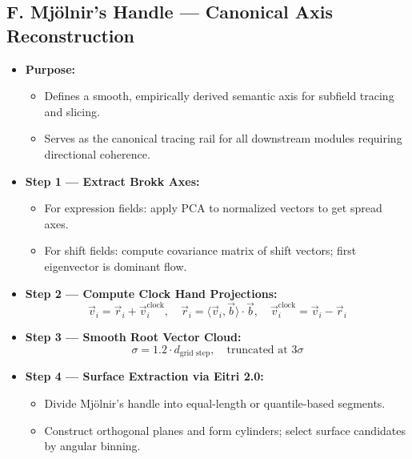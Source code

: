 \documentclass{article}
\begin{document}
\subsection*{F. Mjölnir’s Handle — Canonical Axis Reconstruction}
\begin{itemize}[leftmargin=1.5em]
  \item \textbf{Purpose:}
    \begin{itemize}
      \item Defines a smooth, empirically derived semantic axis for subfield tracing and slicing.
      \item Serves as the canonical tracing rail for all downstream modules requiring directional coherence.
    \end{itemize}

  \item \textbf{Step 1 — Extract Brokk Axes:}
    \begin{itemize}
      \item For expression fields: apply PCA to normalized vectors to get spread axes.
      \item For shift fields: compute covariance matrix of shift vectors; first eigenvector is dominant flow.
    \end{itemize}

  \item \textbf{Step 2 — Compute Clock Hand Projections:}
    \[
    \vec{v}_i = \vec{r}_i + \vec{v}_i^{\text{clock}}, \quad
    \vec{r}_i = \langle \vec{v}_i, \vec{b} \rangle \cdot \vec{b}, \quad
    \vec{v}_i^{\text{clock}} = \vec{v}_i - \vec{r}_i
    \]

  \item \textbf{Step 3 — Smooth Root Vector Cloud:}
    \[
    \sigma = 1.2 \cdot d_{\text{grid step}}, \quad \text{truncated at } 3\sigma
    \]

  \item \textbf{Step 4 — Surface Extraction via Eitri 2.0:}
    \begin{itemize}
      \item Divide Mjölnir's handle into equal-length or quantile-based segments.
      \item Construct orthogonal planes and form cylinders; select surface candidates by angular binning.
    \end{itemize}
\end{itemize}
\end{document}
